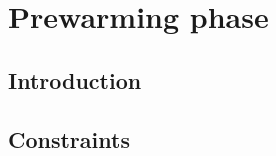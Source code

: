\section{Prewarming phase     \lispDone{}}
\subsection{Introduction      \lispDone{}}      \label{hub: prewarming phase: intro}                
\subsection{Constraints       \lispDone{}}      \label{hub: prewarming phase: constraints}          
